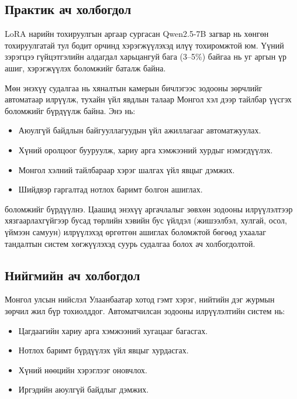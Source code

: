 \subsection*{Практик ач холбогдол}

LoRA нарийн тохируулгын аргаар сургасан Qwen2.5-7B загвар нь хөнгөн тохируулгатай тул бодит орчинд хэрэгжүүлэхэд илүү тохиромжтой юм. Үүний зэрэгцээ гүйцэтгэлийн алдагдал харьцангуй бага (3--5\%) байгаа нь уг аргын үр ашиг, хэрэгжүүлэх боломжийг баталж байна.

Мөн энэхүү судалгаа нь хяналтын камерын бичлэгээс зодооны зөрчлийг автоматаар илрүүлж, тухайн үйл явдлын талаар Монгол хэл дээр тайлбар үүсгэх боломжийг бүрдүүлж байна. Энэ нь:

\begin{itemize}
    \item Аюулгүй байдлын байгууллагуудын үйл ажиллагааг автоматжуулах.
    \item Хүний оролцоог бууруулж, хариу арга хэмжээний хурдыг нэмэгдүүлэх.
    \item Монгол хэлний тайлбараар хэрэг шалгах үйл явцыг дэмжих.
    \item Шийдвэр гаргалтад нотлох баримт болгон ашиглах.
\end{itemize}

боломжийг бүрдүүлнэ. Цаашид энэхүү аргачлалыг зөвхөн зодооны илрүүлэлтээр хязгаарлахгүйгээр бусад төрлийн хэвийн бус үйлдэл (жишээлбэл, хулгай, осол, үймээн самуун) илрүүлэхэд өргөтгөн ашиглах боломжтой бөгөөд ухаалаг тандалтын систем хөгжүүлэхэд суурь судалгаа болох ач холбогдолтой.

\subsection*{Нийгмийн ач холбогдол}

Монгол улсын нийслэл Улаанбаатар хотод гэмт хэрэг, нийтийн дэг журмын зөрчил жил бүр тохиолддог. Автоматчилсан зодооны илрүүлэлтийн систем нь:

\begin{itemize}
    \item Цагдаагийн хариу арга хэмжээний хугацааг багасгах.
    \item Нотлох баримт бүрдүүлэх үйл явцыг хурдасгах.
    \item Хүний нөөцийн хэрэглээг оновчлох.
    \item Иргэдийн аюулгүй байдлыг дэмжих.
\end{itemize}
